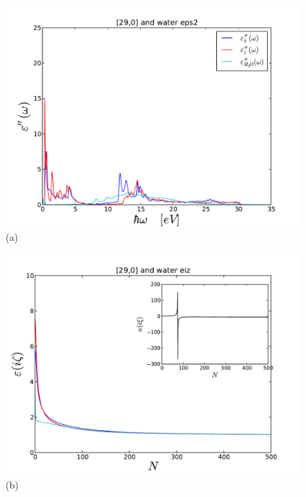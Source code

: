 \documentclass[onecolumn,letterpaper,amsmath,amssymb,floatfix,aps,superscriptaddress]{revtex4}
\begin{document}
\begin{figure}[t!]
\begin{center}
\begin{minipage}[b]{0.40\textwidth}
\begin{center}
\includegraphics[width=1.0\textwidth]{prop_plots/290w290_eps2.pdf} (a)
\end{center}
\end{minipage}
\hskip 43pt
\begin{minipage}[b]{0.40\textwidth}
\begin{center}
\includegraphics[width=1.0\textwidth]{prop_plots/290w290_eiz.pdf} (b)
\end{center}

\end{minipage}
\end{center}
\end{figure}
\end{document}
